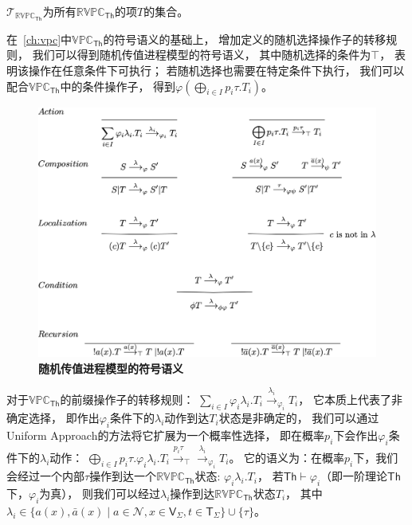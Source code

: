 $\mathcal{T}_{\mathbb{RVPC}_{\mathsf{Th}}}$为所有$\mathbb{RVPC}_\mathsf{Th}$的项$T$的集合。

在~\ref{ch:vpc}中$\mathbb{VPC}_{\mathsf{Th}}$的符号语义的基础上，
增加\label{fig_rccs}定义的随机选择操作子的转移规则，
我们可以得到随机传值进程模型的符号语义，
其中随机选择的条件为$\top$，
表明该操作在任意条件下可执行；
若随机选择也需要在特定条件下执行，
我们可以配合$\mathbb{VPC}_{\mathsf{Th}}$中的条件操作子，
得到$\varphi (\bigoplus_{i\in I}p_i\tau.T_i)$。

\begin{figure}[!htbp]
	\small
	\centering
	\includegraphics[width=14cm]{../figure/symbolic_sematic.png}
    \caption{\textbf{随机传值进程模型的符号语义}}
    \label{fig_sematic}
\end{figure}

对于$\mathbb{VPC}_{\mathsf{Th}}$的前缀操作子的转移规则：
$\sum_{i\in I} \varphi_i \lambda_i. T_i\stackrel{\lambda_i}{\rightarrow}_{\varphi_i} T_i$，
它本质上代表了非确定选择，
即作出$\varphi_i$条件下的$\lambda_i$动作到达$T_i$状态是非确定的，
我们可以通过Uniform Approach的方法将它扩展为一个概率性选择，
即在概率$p_i$下会作出$\varphi_i$条件下的$\lambda_i$动作：
$\bigoplus_{i\in I} p_i\tau.\varphi_i \lambda_i. T_i\stackrel{p_i\tau}{\rightarrow}_{\top}\stackrel{\lambda_i}{\rightarrow}_{\varphi_i} T_i$。
它的语义为：在概率$p_i$下，我们会经过一个内部$\tau$操作到达一个$\mathbb{RVPC}_{\mathsf{Th}}$状态:
$\varphi_i\lambda_i.T_i$，
若$\mathsf{Th}\vdash \varphi_i$（即一阶理论$\mathsf{Th}$下，$\varphi_i$为真），
则我们可以经过$\lambda_i$操作到达$\mathbb{RVPC}_{\mathsf{Th}}$状态$T_i$， 
其中$\lambda_i \in \{a(x),\bar{a}(x)\mid a\in \mathcal{N}, x\in \mathsf{V}_\Sigma, t\in \mathsf{T}_\Sigma\}\cup \{\tau\}$。

